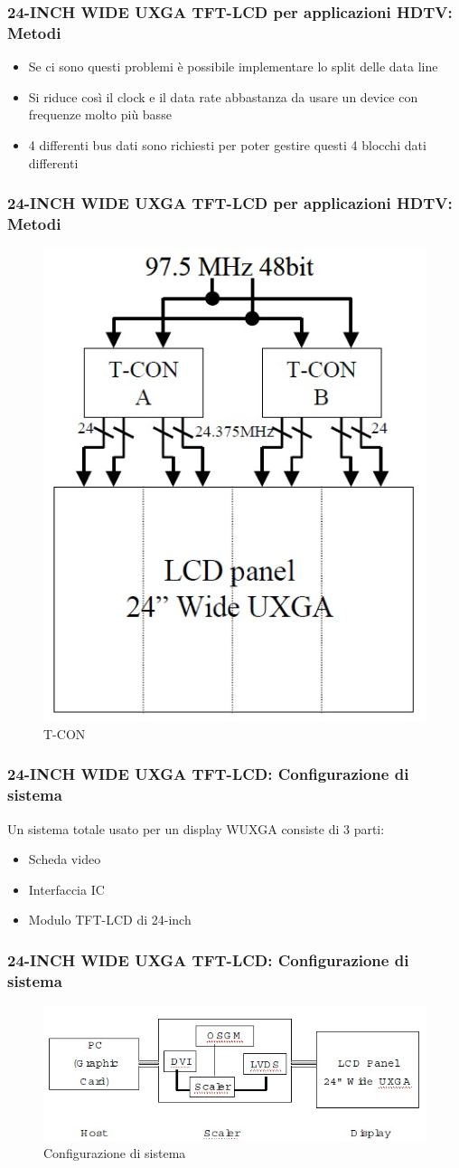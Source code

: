 \documentclass[12pt]{beamer}
\begin{document}
	\begin{frame}
	\frametitle{24-INCH WIDE UXGA TFT-LCD per applicazioni HDTV:  Metodi}
		\begin{itemize}
			\item Se ci sono questi problemi è possibile implementare lo split delle data line
			\pause
			\item Si riduce così il clock e il data rate abbastanza
			da usare un device con frequenze molto più basse
			\pause
			\item 4 differenti bus dati sono richiesti per poter gestire questi 4 blocchi dati differenti
		\end{itemize}
	\end{frame}
	\begin{frame}
		\frametitle{24-INCH WIDE UXGA TFT-LCD per applicazioni HDTV:  Metodi}
		\begin{figure}
			\centering
			\includegraphics[width=0.5\linewidth]{FISICA/T-CON}
			\caption{T-CON}
			\label{fig:t-con}
		\end{figure}
	\end{frame}
	\begin{frame}
		\frametitle{24-INCH WIDE UXGA TFT-LCD: Configurazione di sistema}
		Un sistema totale usato per un display WUXGA consiste di 3 parti:
		\begin{itemize}
			\item Scheda video
			\item Interfaccia IC
			\item Modulo TFT-LCD di 24-inch
		\end{itemize}
	\end{frame}
	\begin{frame}
		\frametitle{24-INCH WIDE UXGA TFT-LCD: Configurazione di sistema}
		\begin{figure}
			\centering
			\includegraphics[width=1\linewidth]{FISICA/sistema_di_conf}
			\caption{Configurazione di sistema}
			\label{fig:sistemadiconf}
		\end{figure}
	\end{frame}
\end{document}
